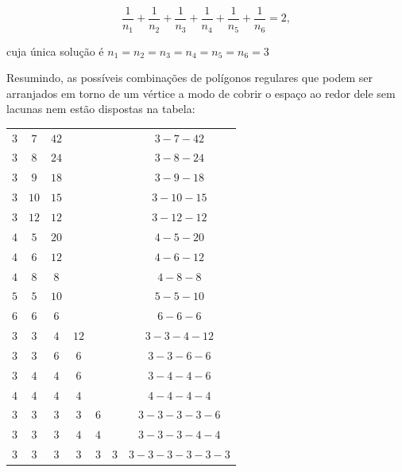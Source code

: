 \begin{equation*}
\frac{1}{n_1}+\frac{1}{n_2}+\frac{1}{n_3}+\frac{1}{n_4}+\frac{1}{n_5}+\frac{1}{n_6}=2,
\end{equation*}

cuja única solução é $n_1=n_2=n_3=n_4=n_5=n_6=3$

Resumindo, as possíveis combinações de polígonos regulares que podem ser arranjados em torno de um vértice a modo de cobrir o espaço ao redor dele sem lacunas nem estão dispostas na tabela:

\setlength\tabcolsep{5mm}
\begin{longtabu} to \textwidth{|c|c|c|c|c|c|c|}
\hline\endfirsthead
{} &  &  & &  &  &  \\
\hline
$3$ & $7$ & $42$ & & & & $3-7-42$ \\
\hline
$3$ & $8$ & $24$ & & & & $3-8-24$ \\
\hline
$3$ & $9$ & $18$ & & & & $3-9-18$ \\
\hline
$3$ & $10$ & $15$ & & & & $ 3-10-15$ \\
\hline
$3$ & $12$ & $12$ & & & & $3-12-12$ \\
\hline
$4$ & $5$ & $20$ & & & & $4-5-20$ \\
\hline
$4$ & $6$ & $12$ & & & & $4-6-12$ \\
\hline
$4$ & $8$ & $8$ & & & & $4-8-8$ \\
\hline
$5$ & $5$ & $10$ & & & & $5-5-10$ \\
\hline
$6$ & $6$ & $6$ & & & & $6-6-6$ \\
\hline
$3$ & $3$ & $4$ & $12$ & & & $3-3-4-12$ \\
\hline
$3$ & $3$ & $6$ & $6$ & & & $3-3-6-6$ \\
\hline
$3$ & $4$ & $4$ & $6$ & & & $3-4-4-6$ \\
\hline
$4$ & $4$ & $4$ & $4$ & & & $4-4-4-4$ \\
\hline
$3$ & $3$ & $3$ & $3$ & $6$ & & $3-3-3-3-6$ \\
\hline
$3$ & $3$ & $3$ & $4$ & $4$ & & $3-3-3-4-4$ \\
\hline
$3$ & $3$ & $3$ & $3$ & $3$ & $3$ & $3-3-3-3-3-3$ \\
\hline
\end{longtabu}

